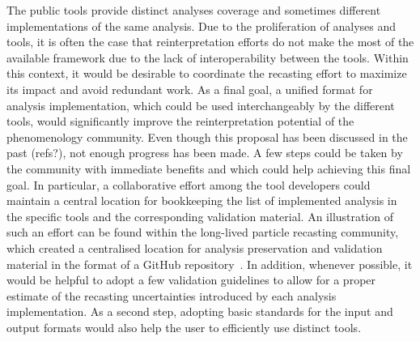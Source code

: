\documentclass[11pt]{article}
\begin{document}
The public tools provide distinct analyses coverage and sometimes different implementations of the same analysis.
Due to the proliferation of analyses and tools, it is often the case that reinterpretation efforts do not make the most of the available framework due to the lack of interoperability between the tools.
Within this context, it would be desirable to coordinate the \gls{recasting} effort to maximize its impact and avoid redundant work. 
As a final goal, a unified format for analysis implementation, which could be used interchangeably by the different tools, would significantly improve the reinterpretation potential of the phenomenology community.
Even though this proposal has been discussed in the past (refs?), not enough progress has been made.
A few steps could be taken by the community with immediate benefits and which could help achieving this final goal.
In particular, a collaborative effort among the tool developers could maintain a central location for bookkeeping the list of implemented analysis in the specific tools and the corresponding validation material.
An illustration of such an effort can be found within the 
long-lived particle \gls{recasting} community, which created a centralised location for \gls{analysis preservation} and validation material in the format of a GitHub repository~\cite{llpRepo}.
In addition, whenever possible, it would be helpful to adopt a few validation guidelines to allow for a proper estimate of the recasting uncertainties introduced by each analysis implementation.
As a second step, adopting basic standards for the input and output formats would also help the user to efficiently use distinct tools.
\end{document}
